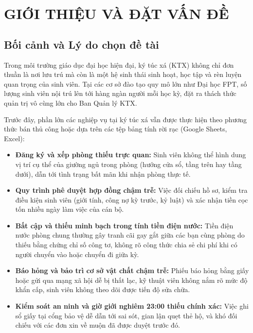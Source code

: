 \documentclass[12pt,a4paper,oneside]{report}
\begin{document}
\newpage
\listoffigures
{}

\newpage
\listoftables
{}

\newpage
{}

\chapter{GIỚI THIỆU VÀ ĐẶT VẤN ĐỀ}
\label{ch:introduction}

\section{Bối cảnh và Lý do chọn đề tài}
Trong môi trường giáo dục đại học hiện đại, ký túc xá (KTX) không chỉ đơn thuần là nơi lưu trú mà còn là một hệ sinh thái sinh hoạt, học tập và rèn luyện quan trọng của sinh viên. Tại các cơ sở đào tạo quy mô lớn như Đại học FPT, số lượng sinh viên nội trú lên tới hàng ngàn người mỗi học kỳ, đặt ra thách thức quản trị vô cùng lớn cho Ban Quản lý KTX.

Trước đây, phần lớn các nghiệp vụ tại ký túc xá vẫn được thực hiện theo phương thức bán thủ công hoặc dựa trên các tệp bảng tính rời rạc (Google Sheets, Excel):
\begin{itemize}
    \item \textbf{Đăng ký và xếp phòng thiếu trực quan:} Sinh viên không thể hình dung vị trí cụ thể của giường ngủ trong phòng (hướng cửa sổ, tầng trên hay tầng dưới), dẫn tới tình trạng bất mãn khi nhận phòng thực tế.
    \item \textbf{Quy trình phê duyệt hợp đồng chậm trễ:} Việc đối chiếu hồ sơ, kiểm tra điều kiện sinh viên (giới tính, công nợ kỳ trước, kỷ luật) và xác nhận tiền cọc tốn nhiều ngày làm việc của cán bộ.
    \item \textbf{Bất cập và thiếu minh bạch trong tính tiền điện nước:} Tiền điện nước phòng chung thường gây tranh cãi gay gắt giữa các bạn cùng phòng do thiếu bằng chứng chỉ số công tơ, không rõ công thức chia sẻ chi phí khi có người chuyển vào hoặc chuyển đi giữa kỳ.
    \item \textbf{Báo hỏng và bảo trì cơ sở vật chất chậm trễ:} Phiếu báo hỏng bằng giấy hoặc gửi qua mạng xã hội dễ bị thất lạc, kỹ thuật viên không nắm rõ mức độ khẩn cấp, sinh viên không theo dõi được tiến độ sửa chữa.
    \item \textbf{Kiểm soát an ninh và giờ giới nghiêm 23:00 thiếu chính xác:} Việc ghi sổ giấy tại cổng bảo vệ dễ dẫn tới sai sót, gian lận quẹt thẻ hộ, và khó đối chiếu với các đơn xin về muộn đã được duyệt trước đó.
\end{itemize}
\end{document}
